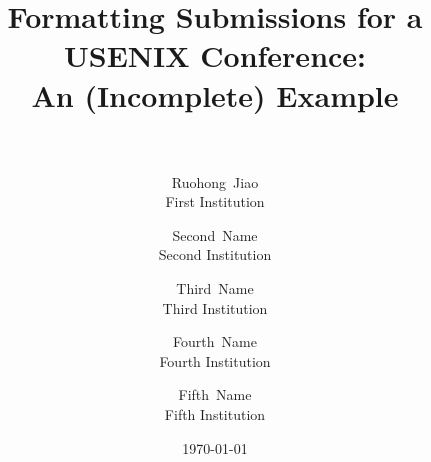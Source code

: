 \title{\Large\bf Formatting Submissions for a USENIX Conference:\\
	An (Incomplete) Example\\
	\\
}
\author{%
	{\rm Ruohong~Jiao}\\
	First Institution
	\and
	{\rm Second~Name}\\
	Second Institution
	\and
	{\rm Third~Name}\\
	Third Institution
	\and
	{\rm Fourth~Name}\\
	Fourth Institution
	\and
	{\rm Fifth~Name}\\
	Fifth Institution
}
\date{\today}
